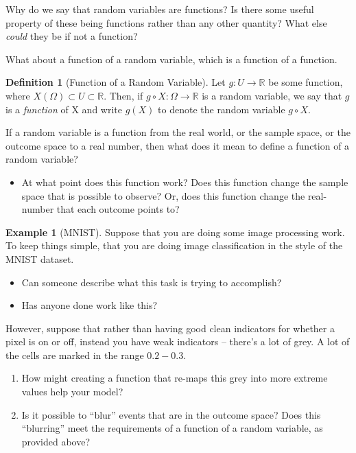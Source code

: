 \documentclass[
]{book}
\providecommand{\tightlist}{%
  \setlength{\itemsep}{0pt}\setlength{\parskip}{0pt}}
\theoremstyle{definition}
\newtheorem{definition}{Definition}[chapter]
\theoremstyle{definition}
\newtheorem{example}{Example}[chapter]
\theoremstyle{definition}
\theoremstyle{definition}
\theoremstyle{remark}
\begin{document}
Why do we say that random variables are functions? Is there some useful property of these being functions rather than any other quantity? What else \emph{could} they be if not a function?

What about a function of a random variable, which is a function of a function.

\begin{definition}[Function of a Random Variable]
Let \(g : U \rightarrow \mathbb{R}\) be some function, where \(X(\Omega) \subset U \subset \mathbb{R}\). Then, if \(g \circ X : \Omega \rightarrow \mathbb{R}\) is a random variable, we say that \(g\) is a \emph{function} of X and write \(g(X)\) to denote the random variable \(g \circ X\).
\end{definition}

If a random variable is a function from the real world, or the sample space, or the outcome space to a real number, then what does it mean to define a function of a random variable?

\begin{itemize}
\tightlist
\item
  At what point does this function work? Does this function change the sample space that is possible to observe? Or, does this function change the real-number that each outcome points to?
\end{itemize}

\begin{example}[MNIST]

Suppose that you are doing some image processing work. To keep things simple, that you are doing image classification in the style of the MNIST dataset.

\begin{itemize}
\tightlist
\item
  Can someone describe what this task is trying to accomplish?
\item
  Has anyone done work like this?
\end{itemize}

However, suppose that rather than having good clean indicators for whether a pixel is on or off, instead you have weak indicators -- there's a lot of grey. A lot of the cells are marked in the range \(0.2 - 0.3\).

\begin{enumerate}
\def\labelenumi{\arabic{enumi}.}
\tightlist
\item
  How might creating a function that re-maps this grey into more extreme values help your model?
\item
  Is it possible to ``blur'' events that are in the outcome space? Does this ``blurring'' meet the requirements of a function of a random variable, as provided above?
\end{enumerate}

\end{example}
\end{document}
